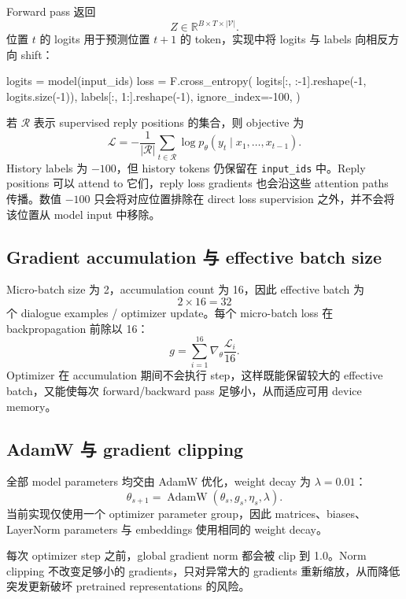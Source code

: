 \documentclass[12pt]{article}
\newcommand{\Vocab}{\mathcal V}
\newcommand{\RSpace}{\mathbb R}
\begin{document}
Forward pass 返回
\[
Z\in\RSpace^{B\times T\times|\Vocab|}.
\]
位置 $t$ 的 logits 用于预测位置 $t+1$ 的 token，实现中将 logits 与 labels 向相反方向 shift：
\begin{pythoncode}[label={lst:loss-shift}]
logits = model(input_ids)
loss = F.cross_entropy(
    logits[:, :-1].reshape(-1, logits.size(-1)),
    labels[:, 1:].reshape(-1),
    ignore_index=-100,
)
\end{pythoncode}
若 $\mathcal R$ 表示 supervised reply positions 的集合，则 objective 为
\begin{equation}
\mathcal L=-\frac1{|\mathcal R|}
\sum_{t\in\mathcal R}
\log p_\theta(y_t\mid x_1,\ldots,x_{t-1}).
\end{equation}
History labels 为 $-100$，但 history tokens 仍保留在 \texttt{input\_ids} 中。Reply positions 可以 attend to 它们，reply loss gradients 也会沿这些 attention paths 传播。数值 $-100$ 只会将对应位置排除在 direct loss supervision 之外，并不会将该位置从 model input 中移除。

\subsection{Gradient accumulation 与 effective batch size}

Micro-batch size 为 2，accumulation count 为 16，因此 effective batch 为
\[
2\times16=32
\]
个 dialogue examples / optimizer update。每个 micro-batch loss 在 backpropagation 前除以 16：
\begin{equation}
g=\sum_{i=1}^{16}\nabla_\theta\frac{\mathcal L_i}{16}.
\end{equation}
Optimizer 在 accumulation 期间不会执行 step，这样既能保留较大的 effective batch，又能使每次 forward/backward pass 足够小，从而适应可用 device memory。

\subsection{AdamW 与 gradient clipping}

全部 model parameters 均交由 AdamW 优化，weight decay 为 $\lambda=0.01$：
\[
\theta_{s+1}=\operatorname{AdamW}(\theta_s,g_s,\eta_s,\lambda).
\]
当前实现仅使用一个 optimizer parameter group，因此 matrices、biases、LayerNorm parameters 与 embeddings 使用相同的 weight decay。

每次 optimizer step 之前，global gradient norm 都会被 clip 到 1.0。Norm clipping 不改变足够小的 gradients，只对异常大的 gradients 重新缩放，从而降低突发更新破坏 pretrained representations 的风险。
\end{document}
